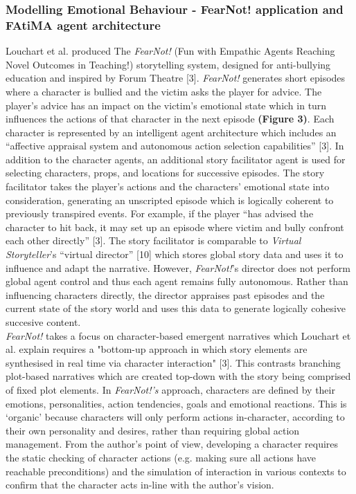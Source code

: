 \documentclass{sig-alternate-05-2015}
\begin{document}
\subsubsection{Modelling Emotional Behaviour - FearNot! application and FAtiMA agent architecture}
Louchart et al. produced The \textit{FearNot!} (Fun with Empathic Agents Reaching Novel Outcomes in Teaching!) storytelling system, designed for anti-bullying education and inspired by Forum Theatre [3]. \textit{FearNot!} generates short episodes where a character is bullied and the victim asks the player for advice. The player's advice has an impact on the victim's emotional state which in turn influences the actions of that character in the next episode \textbf{(Figure 3)}. Each character is represented by an intelligent agent architecture which includes an ``affective appraisal system and autonomous action selection capabilities'' [3]. In addition to the character agents, an additional story facilitator agent is used for selecting characters, props, and locations for successive episodes. The story facilitator takes the player's actions and the characters' emotional state into consideration, generating an unscripted episode which is logically coherent to previously transpired events. For example, if the player ``has advised the character to hit back, it may set up an episode where victim and bully confront each other directly'' [3]. The story facilitator is comparable to \textit{Virtual Storyteller}'s ``virtual director'' [10] which stores global story data and uses it to influence and adapt the narrative. However, \textit{FearNot!}'s director does not perform global agent control and thus each agent remains fully autonomous. Rather than influencing characters directly, the director appraises past episodes and the current state of the story world and uses this data to generate logically cohesive succesive content.\\

\newline \textit{FearNot!} takes a focus on character-based emergent narratives which Louchart et al. explain requires a "bottom-up approach in which story elements are synthesised in real time via character interaction" [3]. This contrasts branching plot-based narratives which are created top-down with the story being comprised of fixed plot elements. In \textit{FearNot!'s} approach, characters are defined by their emotions, personalities, action tendencies, goals and emotional reactions. This is `organic' because characters will only perform actions in-character, according to their own personality and desires, rather than requiring global action management. From the author's point of view, developing a character requires the static checking of character actions (e.g. making sure all actions have reachable preconditions) and the simulation of interaction in various contexts to confirm that the character acts in-line with the author's vision.\\
\end{document}
